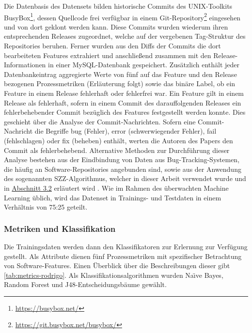 Die Datenbasis des Datensets bilden historische Commits des UNIX-Toolkits BusyBox\footnote{\url{https://busybox.net/}}, dessen Quellcode frei verfügbar in einem Git-Repository\footnote{\url{https://git.busybox.net/busybox/}} eingesehen und von dort geklont werden kann. Diese Commits wurden wiederum ihren entsprechenden Releases zugeordnet, welche auf der vergebenen Tag-Struktur des Repositories beruhen. Ferner wurden aus den Diffs der Commits die dort bearbeiteten Features extrahiert und anschließend zusammen mit den Release-Informationen in einer MySQL-Datenbank gespeichert. Zusätzlich enthält jeder Datenbankeintrag aggregierte Werte von fünf auf das Feature und den Release bezogenen Prozessmetriken (Erläuterung folgt) sowie das binäre Label, ob ein Feature in einem Release fehlerhaft oder fehlerfrei war. Ein Feature gilt in einem Release als fehlerhaft, sofern in einem Commit des darauffolgenden Releases ein fehlerbehebender Commit bezüglich des Features festgestellt werden konnte. Dies geschieht über die Analyse der Commit-Nachrichten. Sofern eine Commit-Nachricht die Begriffe \glqq bug\grqq{} (Fehler), \glqq error\grqq{} (schwerwiegender Fehler), \glqq fail\grqq{} (fehlschlagen) oder \glqq fix\grqq{} (beheben) enthält, werten die Autoren des Papers den Commit als fehlerbehebend. Alternative Methoden zur Durchführung dieser Analyse bestehen aus der Eindbindung von Daten aus Bug-Tracking-Systemen, die häufig an Software-Repositories angebunden sind, sowie aus der Anwendung des sogenannten SZZ-Algorithmus, welcher in dieser Arbeit verwendet wurde und in \hyperref[szz-def]{Abschnitt 3.2} erläutert wird \cite{Sliwerski2005,Zimmermann2007}. Wie im Rahmen des überwachten Machine Learning üblich, wird das Datenset in Trainings- und Testdaten in einem Verhältnis von 75:25 geteilt. 

\subsubsection*{Metriken und Klassifikation}

Die Trainingsdaten werden dann den Klassifikatoren zur Erlernung zur Verfügung gestellt. Als Attribute dienen fünf Prozessmetriken mit spezifischer Betrachtung von Software-Features. Einen Überblick über die Beschreibungen dieser gibt \autoref{tab:metrics-rodrigo}. Als Klassifikationsalgorithmen wurden Na\"{\i}ve Bayes, Random Forest und J48-Entscheidungsbäume gewählt.

